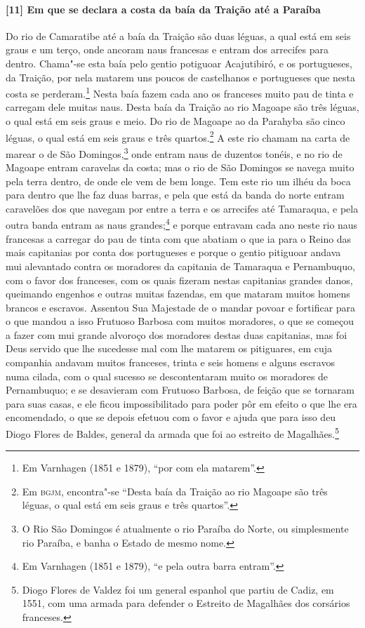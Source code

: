 \paragraph{[11] Em que se declara a costa da baía da Traição até a Paraíba} \quad
Do rio de Camaratibe até a baía da Traição são duas léguas, a qual está em seis graus e um
terço, onde ancoram naus francesas e entram dos arrecifes para dentro. Chama"-se esta baía
pelo gentio potiguoar Acajutibiró, e os portugueses, da Traição, por nela matarem uns
poucos de castelhanos e portugueses que nesta costa se perderam.\footnote{ Em Varnhagen
(1851 e 1879), ``por com ela matarem''.} Nesta baía fazem cada ano os franceses muito pau
de tinta e carregam dele muitas naus. Desta baía da Traição ao rio Magoape são três
léguas, o qual está em seis graus e meio. Do rio de Magoape ao da Parahyba são cinco
léguas, o qual está em seis graus e três quartos.\footnote{ Em \textsc{bgjm}, encontra"-se
``Desta baía da Traição ao rio Magoape são três léguas, o qual está em seis graus e três
quartos''.} A este rio chamam na carta de marear o de São Domingos,\footnote{ O Rio São
Domingos é atualmente o rio Paraíba do Norte, ou simplesmente rio Paraíba, e banha o
Estado de mesmo nome.} onde entram naus de duzentos tonéis, e no rio de Magoape entram
caravelas da costa; mas o rio de São Domingos se navega muito pela terra dentro, de onde
ele vem de bem longe. Tem este rio um ilhéu da boca para dentro que lhe faz duas barras, e
pela que está da banda do norte entram caravelões dos que navegam por entre a terra e os
arrecifes até Tamaraqua, e pela outra banda entram as naus grandes;\footnote{ Em Varnhagen
(1851 e 1879), ``e pela outra barra entram''.} e porque entravam cada ano neste rio naus
francesas a carregar do pau de tinta com que abatiam o que ia para o Reino das mais
capitanias por conta dos portugueses e porque o gentio pitiguoar andava mui alevantado
contra os moradores da capitania de Tamaraqua e Pernambuquo, com o favor dos franceses,
com os quais fizeram nestas capitanias grandes danos, queimando engenhos e outras muitas
fazendas, em que mataram muitos homens brancos e escravos. Assentou Sua Majestade de o
mandar povoar e fortificar para o que mandou a isso Frutuoso Barbosa com muitos moradores,
o que se começou a fazer com mui grande alvoroço dos moradores destas duas capitanias, mas
foi Deus servido que lhe sucedesse mal com lhe matarem os pitiguares, em cuja companhia
andavam muitos franceses, trinta e seis homens e alguns escravos numa cilada, com o qual
sucesso se descontentaram muito os moradores de Pernambuquo; e se desavieram com Frutuoso
Barbosa, de feição que se tornaram para suas casas, e ele ficou impossibilitado para poder
pôr em efeito o que lhe era encomendado, o que se depois efetuou com o favor e ajuda que
para isso deu Diogo Flores de Baldes, general da armada que foi ao estreito de
Magalhães.\footnote{ Diogo Flores de Valdez foi um general espanhol que partiu de Cadiz,
em 1551, com uma armada para defender o Estreito de Magalhães dos corsários franceses.}

